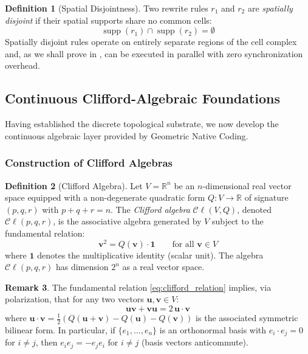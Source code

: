 \documentclass[manuscript, nonacm, review=false]{acmart}
\theoremstyle{definition}
\newtheorem{definition}{Definition}[section]
\newtheorem{remark}[definition]{Remark}
\theoremstyle{plain}
\newcommand{\R}{\mathbb{R}}
\newcommand{\Cl}{\mathcal{C}\!\ell}
\newcommand{\supp}{\operatorname{supp}}
\begin{document}
\begin{definition}[Spatial Disjointness]
\label{def:disjointness}
Two rewrite rules $r_1$ and $r_2$ are \emph{spatially disjoint} if their spatial supports share no common cells:
\begin{equation}
    \supp(r_1) \cap \supp(r_2) = \emptyset
    \label{eq:disjointness}
\end{equation}
Spatially disjoint rules operate on entirely separate regions of the cell complex and, as we shall prove in , can be executed in parallel with zero synchronization overhead.
\end{definition}


\subsection{Continuous Clifford-Algebraic Foundations}
\label{subsec:clifford_foundations}

Having established the discrete topological substrate, we now develop the continuous algebraic layer provided by Geometric Native Coding.

\subsubsection{Construction of Clifford Algebras}

\begin{definition}[Clifford Algebra]
\label{def:clifford}
Let $V = \R^n$ be an $n$-dimensional real vector space equipped with a non-degenerate quadratic form $Q: V \to \R$ of signature $(p, q, r)$ with $p + q + r = n$. The \emph{Clifford algebra} $\Cl(V, Q)$, denoted $\Cl(p,q,r)$, is the associative algebra generated by $V$ subject to the fundamental relation:
\begin{equation}
    \mathbf{v}^2 = Q(\mathbf{v}) \cdot \mathbf{1} \qquad \text{for all } \mathbf{v} \in V
    \label{eq:clifford_relation}
\end{equation}
where $\mathbf{1}$ denotes the multiplicative identity (scalar unit). The algebra $\Cl(p,q,r)$ has dimension $2^n$ as a real vector space.
\end{definition}

\begin{remark}
The fundamental relation \eqref{eq:clifford_relation} implies, via polarization, that for any two vectors $\mathbf{u}, \mathbf{v} \in V$:
\begin{equation}
    \mathbf{u}\mathbf{v} + \mathbf{v}\mathbf{u} = 2\,\mathbf{u} \cdot \mathbf{v}
    \label{eq:anticommutation}
\end{equation}
where $\mathbf{u} \cdot \mathbf{v} = \frac{1}{2}(Q(\mathbf{u}+\mathbf{v}) - Q(\mathbf{u}) - Q(\mathbf{v}))$ is the associated symmetric bilinear form. In particular, if $\{e_1, \ldots, e_n\}$ is an orthonormal basis with $e_i \cdot e_j = 0$ for $i \neq j$, then $e_i e_j = -e_j e_i$ for $i \neq j$ (basis vectors anticommute).
\end{remark}
\end{document}
